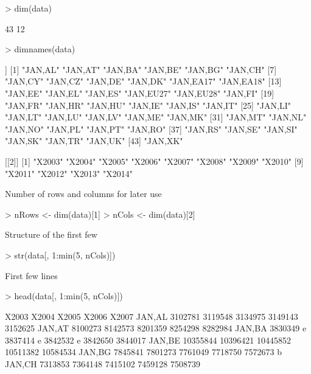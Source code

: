 \documentclass[a4paper,12pt]{article}\usepackage[]{graphicx}\usepackage[]{color}
\begin{document}
\begin{Schunk}
\begin{Sinput}
> dim(data)
\end{Sinput}
\begin{Soutput}
[1] 43 12
\end{Soutput}
\begin{Sinput}
> dimnames(data)
\end{Sinput}
\begin{Soutput}
[[1]]
 [1] "JAN,AL"   "JAN,AT"   "JAN,BA"   "JAN,BE"   "JAN,BG"   "JAN,CH"  
 [7] "JAN,CY"   "JAN,CZ"   "JAN,DE"   "JAN,DK"   "JAN,EA17" "JAN,EA18"
[13] "JAN,EE"   "JAN,EL"   "JAN,ES"   "JAN,EU27" "JAN,EU28" "JAN,FI"  
[19] "JAN,FR"   "JAN,HR"   "JAN,HU"   "JAN,IE"   "JAN,IS"   "JAN,IT"  
[25] "JAN,LI"   "JAN,LT"   "JAN,LU"   "JAN,LV"   "JAN,ME"   "JAN,MK"  
[31] "JAN,MT"   "JAN,NL"   "JAN,NO"   "JAN,PL"   "JAN,PT"   "JAN,RO"  
[37] "JAN,RS"   "JAN,SE"   "JAN,SI"   "JAN,SK"   "JAN,TR"   "JAN,UK"  
[43] "JAN,XK"  

[[2]]
 [1] "X2003" "X2004" "X2005" "X2006" "X2007" "X2008" "X2009" "X2010"
 [9] "X2011" "X2012" "X2013" "X2014"
\end{Soutput}
\end{Schunk}

Number of rows and columns for later use
\begin{Schunk}
\begin{Sinput}
> nRows <- dim(data)[1]
> nCols <- dim(data)[2]
\end{Sinput}
\end{Schunk}


Structure of the first few
\begin{Schunk}
\begin{Sinput}
> str(data[, 1:min(5, nCols)])
\end{Sinput}
\end{Schunk}

First few lines

\begin{Schunk}
\begin{Sinput}
> head(data[, 1:min(5, nCols)])
\end{Sinput}
\begin{Soutput}
           X2003     X2004     X2005    X2006     X2007
JAN,AL  3102781   3119548   3134975   3149143  3152625 
JAN,AT  8100273   8142573   8201359   8254298  8282984 
JAN,BA 3830349 e 3837414 e 3842532 e  3842650  3844017 
JAN,BE 10355844  10396421  10445852  10511382 10584534 
JAN,BG  7845841   7801273   7761049   7718750 7572673 b
JAN,CH  7313853   7364148   7415102   7459128  7508739 
\end{Soutput}
\end{Schunk}
\clearpage
\end{document}

